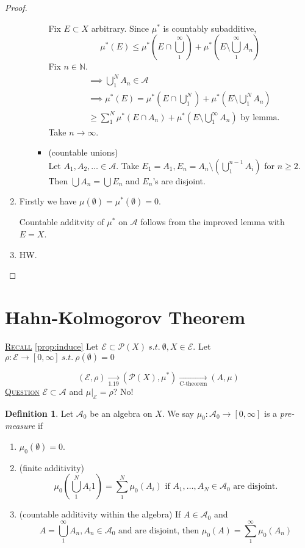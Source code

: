 \documentclass{report}
\newcommand{\N}{\mathbb{N}}
\newcommand{\st}{\ s.t.\ }
\newcommand{\fancyem}[1]{\underline{\textsc{#1}}}
\theoremstyle{definition}
\newtheorem{definition}[theorem]{Definition}
\theoremstyle{remark}
\begin{document}
\begin{proof}
\begin{enumerate}
\begin{enumerate}
\begin{itemize}
		Fix $E \subset X$ arbitrary.
		Since $\mu^*$ is countably subadditive, 
		\[
		\mu^*(E) \leq \mu^*\left(E \cap \bigcup_1^\infty\right) + \mu^*\left(E \setminus \bigcup_1^\infty A_n\right)
		\]
		Fix $n \in \N.$
		\begin{align*}
		& \implies \bigcup_1^N A_n \in \mathcal{A} \\
		& \implies \mu^*(E) = \mu^*\left(E \cap \bigcup_1^N\right) + \mu^*\left(E \setminus \bigcup_1^N A_n\right) \\
		& \geq \sum_{1}^N \mu^*(E \cap A_n) + \mu^*\left(E \setminus \bigcup_1^\infty A_n\right) \text{ by lemma}.
		\end{align*}
		Take $n \to \infty.$
		\item
		(countable unions)\\
		Let $A_1, A_2, \ldots \in \mathcal{A}.$ Take $E_1 = A_1, E_n = A_n \setminus \left(\bigcup_1^{n-1} A_i\right)$ for $n \geq 2.$ Then $\bigcup A_n = \bigcup E_n$ and $E_n$'s are disjoint.
		\end{itemize}
	\end{enumerate}
	\item
	Firstly we have $\mu(\emptyset) = \mu^*(\emptyset) = 0.$
	
	Countable additvity of $\mu^*$ on $\mathcal{A}$ follows from the improved lemma with $E = X$.	
	
	\item
	HW. \qedhere
\end{enumerate}
\end{proof}

\section{Hahn-Kolmogorov Theorem}
\fancyem{Recall} \ref{prop:induce} Let $\mathcal{E} \subset \mathcal{P}(X) \st \emptyset, X \in \mathcal{E}.$ Let $\rho: \mathcal{E} \to [0, \infty] \st \rho(\emptyset) = 0$

\[
(\mathcal{E}, \rho) \xrightarrow[1.19]{} (\mathcal{P}(X), \mu^*) \xrightarrow[\text{C-theorem}]{} (A, \mu)
\] 
\fancyem{Question} $\mathcal{E} \subset \mathcal{A}$ and $\mu|_\mathcal{E} = \rho$? No!
\begin{definition}
Let $\mathcal{A}_0$ be an algebra on $X$. We say $\mu_0: \mathcal{A}_0 \to [0, \infty]$ is a \emph{pre-measure} if 
\begin{enumerate}
\item $\mu_0(\emptyset) = 0.$
\item (finite additivity)
\[
\mu_0\left(\bigcup_1^N A_i1\right) = \sum_1^N \mu_0(A_i) \text{ if } A_1, \ldots, A_N \in \mathcal{A}_0 \text{ are disjoint.}
\]
\item (countable additivity within the algebra) If $A \in \mathcal{A}_0$ and 
\[
A = \bigcup_1^\infty A_n, A_n \in \mathcal{A}_0 \text{ and are disjoint, then } \mu_0(A) = \sum_1^\infty \mu_0(A_n)
\]
\end{enumerate}
\end{definition}
\end{document}
